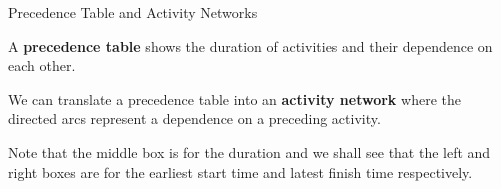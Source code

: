 \documentclass[8pt]{beamer}
\begin{document}
\begin{frame}[shrink=10]{Precedence Table and Activity Networks}

\begin{definition}
	A \textbf{precedence table} shows the duration of activities and their dependence on each other. 
\end{definition}

\centering
{}

\begin{definition}
	We can translate a precedence table into an \textbf{activity network} where the directed arcs represent a dependence on a preceding activity. 
	
\end{definition}

\centering
{}

\alert{Note that the middle box is for the duration and we shall see that the left and right boxes are for the earliest start time and latest finish time respectively.}
	
\end{frame}
\end{document}
